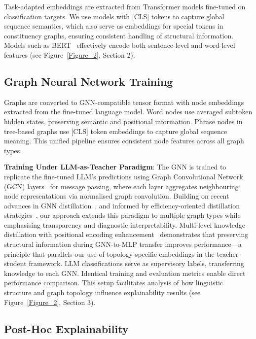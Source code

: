 \documentclass[preprint, times, review, 10pt]{elsarticle}
\begin{document}
Task-adapted embeddings are extracted from Transformer models fine-tuned on classification targets. We use models with [CLS] tokens to capture global sequence semantics, which also serve as embeddings for special tokens in constituency graphs, ensuring consistent handling of structural information. Models such as BERT~\cite{devlin2019bert} effectively encode both sentence-level and word-level features (see Figure~\ref{Figure_2}, Section 2).

\subsection{Graph Neural Network Training} \label{gnn}

Graphs are converted to GNN-compatible tensor format with node embeddings extracted from the fine-tuned language model. Word nodes use averaged subtoken hidden states, preserving semantic and positional information. Phrase nodes in tree-based graphs use [CLS] token embeddings to capture global sequence meaning. This unified pipeline ensures consistent node features across all graph types.

\textbf{Training Under LLM-as-Teacher Paradigm}: The GNN is trained to replicate the fine-tuned LLM's predictions using Graph Convolutional Network (GCN) layers~\cite{kipf2017semisupervisedclassificationgraphconvolutional} for message passing, where each layer aggregates neighbouring node representations via normalised graph convolution. Building on recent advances in GNN distillation~\cite{mavromatis2023traingnnteachergraphaware, li2024enhancinggraphneuralnetworks, hu2024largelanguagemodelmeets}, and informed by efficiency-oriented distillation strategies~\cite{xu2023computation}, our approach extends this paradigm to multiple graph types while emphasising transparency and diagnostic interpretability. Multi-level knowledge distillation with positional encoding enhancement~\cite{xu2025mlkdpe} demonstrates that preserving structural 
information during GNN-to-MLP transfer improves performance—a principle that parallels our use of topology-specific embeddings in the teacher-student framework. LLM classifications serve as supervisory labels, transferring knowledge to each GNN. Identical training and evaluation metrics enable direct performance comparison. This setup facilitates analysis of how linguistic structure and graph topology influence explainability results (see Figure~\ref{Figure_2}, Section 3).


\subsection{Post-Hoc Explainability}
\label{explainability}
\end{document}
